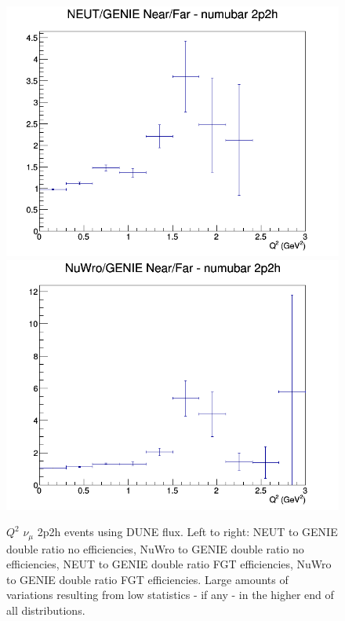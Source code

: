 \documentclass[12pt]{article}
\begin{document}
\begin{figure}[h]
\endminipage
{}
\includegraphics[width=\linewidth]{eff_Q2/FGT/ratios/2p2h_NEUT_GENIE_numubar_NF_Q2.png}
\endminipage
{}
\includegraphics[width=\linewidth]{eff_Q2/FGT/ratios/2p2h_NuWro_GENIE_numubar_NF_Q2.png}
\endminipage
\caption{$Q^2$ $\nu_{\mu}$ 2p2h events using DUNE flux. Left to right: NEUT to GENIE double ratio no efficiencies, NuWro to GENIE double ratio no efficiencies, NEUT to GENIE double ratio FGT efficiencies, NuWro to GENIE double ratio FGT efficiencies. Large amounts of variations resulting from low statistics - if any - in the higher end of all distributions.}
\label{fig:Q2_2p2h}
\end{figure}
\FloatBarrier
\end{document}

